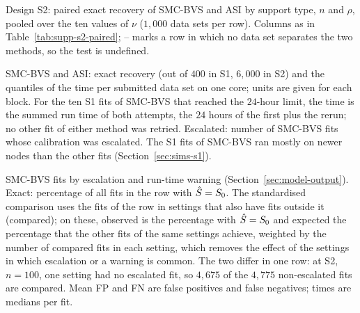 \begin{table}[htbp]\centering\small
\caption{Design S2: paired exact recovery of SMC-BVS and ASI by support type, $n$ and $\rho$, pooled over the ten
values of $\nu$ ($1{,}000$ data sets per row). Columns as in Table~\ref{tab:supp-s2-paired}; -- marks a row in which no
data set separates the two methods, so the test is undefined.}\label{tab:supp-s2-paired-bys}

\end{table}

\begin{table}[htbp]\centering\small
\caption{SMC-BVS and ASI: exact recovery (out of $400$ in S1, $6{,}000$ in S2) and the quantiles of the time per
submitted data set on one core; units are given for each block. For the ten S1 fits of SMC-BVS that reached the
$24$-hour limit, the time is the summed run time of both attempts,
the $24$ hours of the first plus the rerun; no other fit of either method was
retried. Escalated: number of SMC-BVS fits whose calibration was escalated. The S1 fits of SMC-BVS ran mostly on newer
nodes than the other fits (Section~\ref{sec:sims-s1}).}\label{tab:supp-cost-smc-asi}

\end{table}

\begin{table}[htbp]\centering\footnotesize
\caption{SMC-BVS fits by escalation and run-time warning (Section~\ref{sec:model-output}). Exact: percentage of all
fits in the row with $\Shat=\Sz$. The standardised comparison uses the fits of the row in settings that also have
fits outside it (compared); on these, observed is the percentage with $\Shat=\Sz$ and expected the percentage that the
other fits of the same settings achieve, weighted by the number of compared fits in each setting, which removes the
effect of the settings in which escalation or a warning is common. The two differ in one row: at S2, $n=100$, one
setting had no escalated fit, so $4{,}675$ of the $4{,}775$ non-escalated fits are compared. Mean FP and FN are false
positives and false negatives; times are medians per fit.}\label{tab:supp-escalation}

\end{table}
